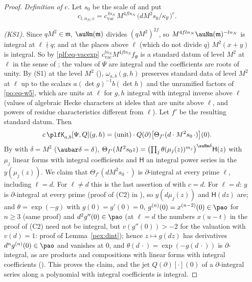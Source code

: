 \documentclass[10pt]{amsart}
\theoremstyle{definition}
\theoremstyle{remark}
\begin{document}
\begin{proof}
\emph{Definition of $c$.} Let $s_0$ be the scale of {\cite[\S5.2.8]{P49}} and put
\[
c_{l,n_N,e}=c_{\mathrm{vac}}^{\,ln_N}\,M^{4fln_N}\,\bigl(dM^2s_0/\kappa_{\mathrm F}\bigr)^e .
\]

\emph{(KS1).} Since $qM^2\in\mathfrak m$, $\auNm(\mathfrak m)$ divides $(qM^2)^{2f}$, so
$M^{4fln_N}\auNm(\mathfrak m)^{-ln_N}$ is integral at $\ell\nmid q$; and at the places above $\ell$
(which do not divide $q$) $M^2(x+y)$ is integral. So by \eqref{plf:eq-vacexp}
$c_{\mathrm{vac}}^{ln_N}M^{4fln_N}f_\Psi$ is a standard datum of level $M^2$ at $\ell$ in the sense of
{\cite[\S7.4]{P49}}; the values of $\Psi$ are integral and the coefficients are roots of unity.
By (S1) at the level $M^2$ ({\cite[\S7.4]{P49}}), $\omega_{a,b}(g,h)$ preserves standard data of
level $M^2$ at $\ell$ up to the scalars $a(\det g)^{-1}b(\det h)$ and the unramified factors of
\eqref{po:eq-w5}, which are units at $\ell$ for $g,h$ integral with integral inverse above $\ell$
(values of algebraic Hecke characters at ideles that are units above $\ell$, and powers of residue
characteristics different from $\ell$). Let $f'$ be the resulting standard datum. Then
\[
c\,\plfK_{a,b}[\Psi,Q](g,h)=(\text{unit})\cdot Q(\partial)\bigl[\Theta_{f'}(d\cdot M^2s_0\,\cdot)\bigr](0).
\]
By {\cite[Theorem~7.15]{P49}} with $\delta=M^2$ ($\aubar\delta=\delta$), $\Theta_{f'}(M^2s_0z)=\bigl(\prod_j
\theta(\mu_j(z))^{m_j}\bigr)^{\auNm\delta}\mathsf H(z)$ with $\mu_j$ linear forms with integral
coefficients and $\mathsf H$ an integral power series in the $y(\mu_j(z))$. We claim that
$\Theta_{f'}(dM^2s_0\,\cdot)$ is $\partial$-integral at every prime $\ell$, including $\ell=d$. For
$\ell\ne d$ this is the last assertion of {\cite[Theorem~7.15]{P49}} with $c=d$. For $\ell=d$: $y$ is
$\partial$-integral at every prime (proof of (C2) in {\cite[Proposition~5.25]{P49}}), so $y(d\mu_j(z))$
and $\mathsf H(dz)$ are; and $\theta=\exp(-g)$ with $g(0)=g'(0)=0$, $g^{(n)}(0)=x^{(n-2)}(0)\in\pao$ for
$n\ge3$ (same proof) and $d^2g''(0)\in\pao$ (at $\ell=d$ the numbers $x(u-t)$ in the proof of (C2) need
not be integral, but $v(g''(0))>-2$ for the valuation with $v(d)=1$: proof of Lemma~\ref{pex:dint}); hence
$z\mapsto g(dz)$ has derivatives $d^ng^{(n)}(0)\in
\pao$ and vanishes at $0$, and $\theta(d\,\cdot)=\exp(-g(d\,\cdot))$ is $\partial$-integral, as are
products and compositions with linear forms with integral coefficients ({\cite[\S4.3]{P49}}). This
proves the claim, and the jet $Q(\partial)[\cdot](0)$ of a $\partial$-integral series along a polynomial
with integral coefficients is integral.


\end{proof}
\end{document}
